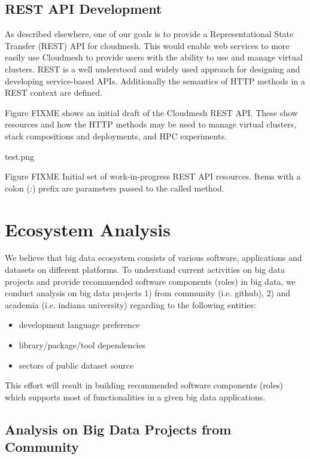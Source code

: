 \documentclass[9pt,twocolumn,twoside]{styles/osajnl}
\begin{document}
\subsection{REST API Development}

As described elsewhere, one of our goals is to provide a Representational State Transfer (REST) API for cloudmesh. This would enable web services to more easily use Cloudmesh to provide users with the ability to use and manage virtual clusters.  REST is a well understood and widely used approach for designing and developing service-based APIs. Additionally the semantics of HTTP methods in a REST context are defined.


Figure FIXME shows an initial draft of the Cloudmesh REST API. These show resources and how the HTTP methods may be used to manage virtual clusters, stack compositions and deployments, and HPC experiments.


 test.png 

Figure FIXME Initial set of work-in-progress REST API resources.
Items with a colon (:) prefix are parameters passed to the called method.




\section{Ecosystem Analysis}



We believe that big data ecosystem consists of various software, applications and datasets on different platforms. To understand current activities on big data projects and provide recommended software components (roles) in big data, we conduct analysis on big data projects 1) from community (i.e. github), 2) and academia (i.e. indiana university) regarding to the following entities:

\begin{itemize}
\item development language preference
\item library/package/tool dependencies
\item sectors of public dataset source
\end{itemize}

This effort will result in building recommended software components (roles) which supports most of functionalities in a given big data applications.

\subsection{Analysis on Big Data Projects from Community}
\end{document}
